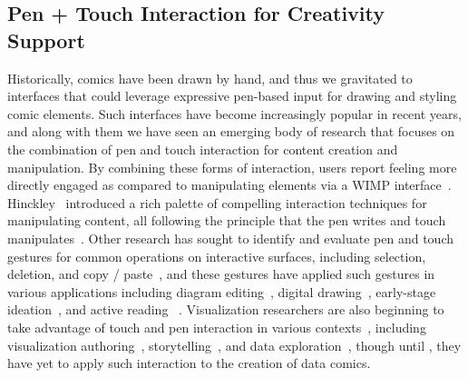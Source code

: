
\subsection{Pen + Touch Interaction for Creativity Support}
Historically, comics have been drawn by hand, and thus we gravitated to interfaces that could leverage expressive pen-based input for drawing and styling comic elements.
Such interfaces have become increasingly popular in recent years, and along with them we have seen an emerging body of research that focuses on the combination of pen and touch interaction for content creation and manipulation. 
By combining these forms of interaction, users report feeling more directly engaged as compared to manipulating elements via a WIMP interface~\cite{xia2018dataink}. 
Hinckley \etal~introduced a rich palette of compelling interaction techniques for manipulating content, all following the principle that the pen writes and touch manipulates~\cite{hinckley2010pen,pfeuffer2017thumb}. 
Other research has sought to identify and evaluate pen and touch gestures for common operations on interactive surfaces, including selection, deletion, and copy / paste~\cite{morris2010understanding}, and these gestures have applied such gestures in various applications including diagram editing~\cite{frisch2009investigating}, digital drawing~\cite{xia2016object,xia2017collection}, early-stage ideation~\cite{xia2017writlarge}, and active reading ~\cite{hinckley2012informal}. 
Visualization researchers are also beginning to take advantage of touch and pen interaction in various contexts~\cite{lee2012beyond}, including visualization authoring~\cite{xia2018dataink}, storytelling~\cite{lee2013sketchstory}, and data exploration~\cite{zgraggen2014panoramicdata,jo2017touchpivot}, though until \toolname{}, they have yet to apply such interaction to the creation of data comics.







